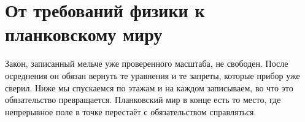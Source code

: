 \chapter{От требований физики к планковскому миру}
\label{ch:descent}

Закон, записанный мельче уже проверенного масштаба, не свободен.
После осреднения он обязан вернуть те уравнения и те запреты, которые прибор уже сверил.
Ниже мы спускаемся по этажам и на каждом записываем, во что это обязательство превращается.
Планковский мир в конце есть то место, где непрерывное поле в точке перестаёт с обязательством справляться.











